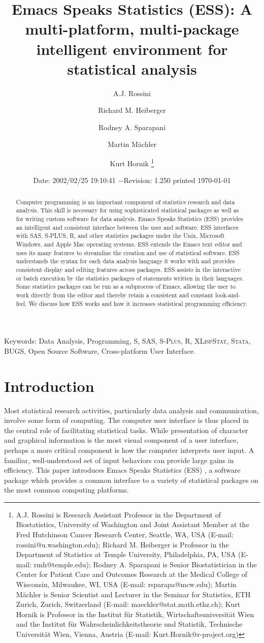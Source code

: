 \documentclass{article}
\title{Emacs Speaks Statistics (ESS): A multi-platform, multi-package
intelligent environment for statistical analysis}
\author{A.J. Rossini \and Richard M. Heiberger \and Rodney A. Sparapani
\and Martin M{\"a}chler \and Kurt Hornik \footnote{%
    A.J. Rossini is Research Assistant Professor in the Department of
    Biostatistics, University of Washington and Joint Assistant Member at
    the Fred Hutchinson Cancer Research Center, Seattle, WA, USA
    (E-mail: rossini@u.washington.edu);
    Richard M. Heiberger is Professor in the Department of Statistics at
    Temple University, Philadelphia, PA, USA (E-mail: rmh@temple.edu);
    Rodney A. Sparapani is Senior Biostatistician in the Center for Patient
    Care and Outcomes Research at the Medical College of Wisconsin,
    Milwaukee, WI, USA (E-mail: rsparapa@mcw.edu);
    Martin M{\"a}chler is Senior Scientist and Lecturer in the Seminar for
    Statistics, ETH Zurich, Zurich, Switzerland
    (E-mail: maechler@stat.math.ethz.ch);
    Kurt Hornik is Professor in the Institut f{\"u}r Statistik,
    Wirtschaftsuniversit{\"a}t Wien and the Institut f{\"u}r
    Wahrscheinlichkeitstheorie und Statistik, Technische Universit{\"a}t
    Wien, Vienna, Austria (E-mail: Kurt.Hornik@r-project.org)}}
\date{$ $Date: 2002/02/25 19:10:41 $ - $Revision: 1.250 $ $\tiny printed \today}
\newif\ifdraft
\renewcommand{\baselinestretch}{1.5}
\newcommand*{\SAS}{\textsc{SAS}}
\newcommand*{\Splus}{\textsc{S-Plus}}
\newcommand*{\XLispStat}{\textsc{XLispStat}}
\newcommand*{\Stata}{\textsc{Stata}}
\begin{document}

\ifdraft
\setcounter{page}{0}
\tableofcontents
\fi

\maketitle

\ifdraft{}%
\else%
 \renewcommand{\baselinestretch}{1.5}
\fi

\begin{abstract}
  Computer programming is an important component of statistics
  research and data analysis.  This skill is necessary for using
  sophisticated statistical packages as well as for writing custom
  software for data analysis.  Emacs Speaks Statistics (ESS) provides
  an intelligent and consistent interface between the user and
  software.  ESS interfaces with SAS, S-PLUS, R, and other statistics
  packages under the Unix, Microsoft Windows, and Apple Mac operating
  systems.  ESS extends the Emacs text editor and uses its many
  features to streamline the creation and use of statistical software.
  ESS understands the syntax for each data analysis language it works
  with and provides consistent display and editing features across
  packages.  ESS assists in the interactive or batch execution by the
  statistics packages of statements written in their languages.  Some
  statistics packages can be run as a subprocess of Emacs, allowing
  the user to work directly from the editor and thereby retain a
  consistent and constant look-and-feel.  We discuss how ESS works and
  how it increases statistical programming efficiency.
\end{abstract}

\noindent Keywords: Data Analysis, Programming,
S, \SAS, \Splus, R, \XLispStat, \Stata, BUGS, Open Source Software,
Cross-platform User Interface.

\section{Introduction}
\label{sec:introduction}

Most statistical research activities, particularly data analysis and
communication, involve some form of computing.  The computer user
interface is thus placed in the central role of facilitating
statistical tasks.  While presentation of character and graphical
information is the most visual component of a user interface,
perhaps a more critical component is how the computer interprets user
input.  A familiar, well-understood set of input behaviors can provide
large gains in efficiency.  This paper introduces Emacs Speaks
Statistics (ESS) \citep{ESS}, a software package which provides a
common interface to a variety of statistical packages on the most
common computing platforms.
\end{document}

